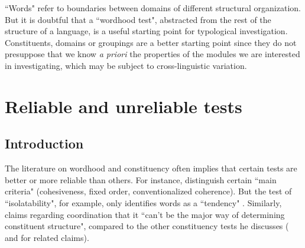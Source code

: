 \documentclass[output=paper,draftmode]{langscibook}
\begin{document}

``Words" refer to boundaries between domains of different structural organization. But it is doubtful that a ``wordhood test", abstracted from the rest of the structure of a language, is a useful starting point for typological investigation. Constituents, domains or groupings are a better starting point since they do not presuppose that we know \textit{a priori} the properties of the modules we are interested in investigating, which may be subject to cross-linguistic variation.


\section{Reliable and unreliable tests}
\label{sec:reliabelandunreliabletests}

\subsection{Introduction}

The literature on wordhood and constituency often implies that certain tests are better or more reliable than others. For instance, \citet{dixonaikhenvald02} distinguish certain ``main criteria" (cohesiveness, fixed order, conventionalized coherence). But the test of ``isolatability", for example, only identifies words as a ``tendency" \citep[25]{dixonaikhenvald:2002}. Similarly, \citet[162]{payne2006exploring} claims regarding coordination that it ``can't be the major way of determining constituent structure", compared to the other constituency tests he discusses (\citealt[125]{adger2003core} and \citealt[21]{carnie2008constituent} for related claims). 
\end{document}
